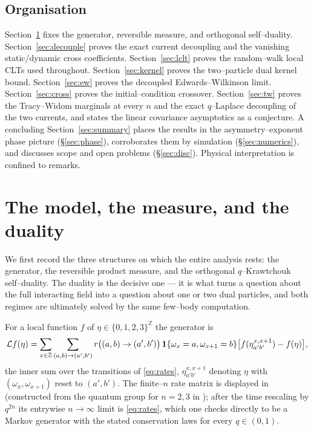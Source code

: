 \documentclass[11pt]{article}
\theoremstyle{plain}
\theoremstyle{definition}
\theoremstyle{remark}
\newcommand{\Z}{\mathbb{Z}}\newcommand{\R}{\mathbb{R}}\newcommand{\N}{\mathbb{N}}
\newcommand{\cL}{\mathcal L}\newcommand{\cO}{\mathcal O}\newcommand{\cE}{\mathcal E}
\begin{document}
\subsection{Organisation}\label{sec:introorg}
Section~\ref{sec:model} fixes the generator, reversible measure, and orthogonal
self--duality. Section~\ref{sec:decouple} proves the exact current decoupling and the
vanishing static/dynamic cross coefficients. Section~\ref{sec:lclt} proves the
random--walk local CLTs used throughout. Section~\ref{sec:kernel} proves the
two--particle dual kernel bound. Section~\ref{sec:ew} proves the decoupled
Edwards--Wilkinson limit. Section~\ref{sec:cross} proves the initial--condition
crossover. Section~\ref{sec:tw} proves the Tracy--Widom marginals at every $n$ and
the exact $q$--Laplace decoupling of the two currents, and states the linear
covariance asymptotics as a conjecture. A concluding Section~\ref{sec:summary} places the
results in the asymmetry--exponent phase picture (\S\ref{sec:phase}), corroborates them
by simulation (\S\ref{sec:numerics}), and discusses scope and open problems
(\S\ref{sec:disc}). Physical interpretation is confined to remarks.

\section{The model, the measure, and the duality}\label{sec:model}

We first record the three structures on which the entire analysis rests: the generator,
the reversible product measure, and the orthogonal $q$--Krawtchouk self--duality. The
duality is the decisive one --- it is what turns a question about the full interacting
field into a question about one or two dual particles, and both regimes are ultimately
solved by the same few--body computation.

For a local function $f$ of $\eta\in\{0,1,2,3\}^\Z$ the generator is
\begin{equation}\label{eq:gen}
  \cL f(\eta)=\sum_{x\in\Z}\sum_{(a,b)\to(a',b')}
   r\big((a,b)\to(a',b')\big)\,\bone\{\omega_x=a,\omega_{x+1}=b\}
   \big[f(\eta^{x,x+1}_{a'b'})-f(\eta)\big],
\end{equation}
the inner sum over the transitions of \eqref{eq:rates}, $\eta^{x,x+1}_{a'b'}$ denoting
$\eta$ with $(\omega_x,\omega_{x+1})$ reset to $(a',b')$. The finite--$n$ rate matrix
is displayed in \cite[\S2.1]{REU} (constructed from the quantum group for $n=2,3$ in
\cite{KLLPZ}); after the time rescaling by $q^{2n}$ its entrywise $n\to\infty$ limit
is \eqref{eq:rates}, which one checks directly to be a Markov generator with the
stated conservation laws for every $q\in(0,1)$.
\end{document}
